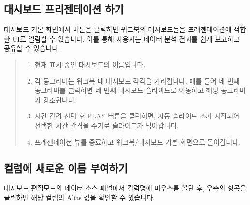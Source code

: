 \documentclass[letterpaper,10pt,english]{sphinxmanual}
\begin{document}
\subsection{대시보드 프리젠테이션 하기}
\label{\detokenize{discovery/part04/present_the_dashboard:id1}}\label{\detokenize{discovery/part04/present_the_dashboard::doc}}
대시보드 기본 화면에서  버튼을 클릭하면 워크북의 대시보드들을 프레젠테이션에 적합한 UI로 열람할 수 있습니다. 이를 통해 사용자는 데이터 분석 결과를 쉽게 보고하고 공유할 수 있습니다.
\begin{quote}

\begin{figure}[H]
\centering

\noindent{}
\end{figure}
\begin{enumerate}
\def\theenumi{\arabic{enumi}}
\def\labelenumi{\theenumi .}
\makeatletter\def\p@enumii{\p@enumi \theenumi .}\makeatother
\item {} 
 현재 표시 중인 대시보드의 이름입니다.

\item {} 
 각 동그라미는 워크북 내 대시보드 각각을 가리킵니다. 예를 들어 네 번째 동그라미를 클릭하면 네 번째 대시보드 슬라이드로 이동하고 해당 동그라미가 강조됩니다.

\item {} 
 시간 간격 선택 후 PLAY 버튼을 클릭하면, 자동 슬라이드 쇼가 시작되어 선택한 시간 간격을 주기로 슬라이드가 넘어갑니다.

\item {} 
 프레젠테이션 뷰를 종료하고 워크북/대시보드 기본 화면으로 돌아갑니다.

\end{enumerate}
\end{quote}


\subsection{컬럼에 새로운 이름 부여하기}
\label{\detokenize{discovery/part04/give_new_column_name(alias):id1}}\label{\detokenize{discovery/part04/give_new_column_name(alias)::doc}}
대시보드 편집모드의 데이터 소스 패널에서 컬럼명에 마우스를 올린 후, 우측의 항목을 클릭하면 해당 컬럼의 Alias 값을 확인할 수 있습니다.
\begin{quote}

\begin{figure}[H]
\centering

\noindent{}
\end{figure}
\end{quote}
\end{document}
